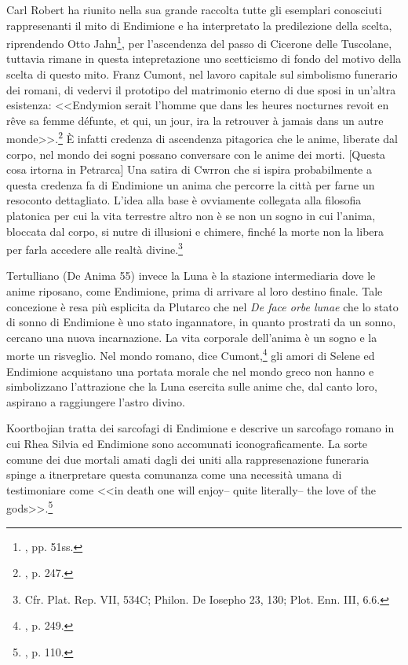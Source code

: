 \documentclass[12pt,a4paper,openright, oneside]{book}
\begin{document}
Carl Robert ha riunito nella sua grande raccolta tutte gli esemplari conosciuti rappresenanti il mito di Endimione e ha interpretato la predilezione della scelta, riprendendo Otto Jahn\footnote{\cite{Jahn}, pp. 51ss.}, per l'ascendenza del passo di Cicerone delle Tuscolane, tuttavia rimane in questa intepretazione uno scetticismo di fondo del motivo della scelta di questo mito.
Franz Cumont, nel lavoro capitale sul simbolismo funerario dei romani, di vedervi il prototipo del matrimonio eterno di due sposi in un'altra esistenza: <<Endymion serait l'homme que dans les heures nocturnes revoit en r\^eve sa femme défunte, et qui, un jour, ira la retrouver à jamais dans un autre monde>>.\footnote{\cite{Cumont}, p. 247.} È infatti credenza di ascendenza pitagorica che le anime, liberate dal corpo, nel mondo dei sogni possano conversare con le anime dei morti. [Questa cosa irtorna in Petrarca] Una satira di Cwrron che si ispira probabilmente a questa credenza fa di Endimione un anima che percorre la città per farne un resoconto dettagliato. L'idea alla base è ovviamente collegata alla filosofia platonica per cui la vita terrestre altro non è se non un sogno in cui l'anima, bloccata dal corpo, si nutre di illusioni e chimere, finché la morte non la libera per farla accedere alle realtà divine.\footnote{Cfr. Plat. Rep. VII, 534C; Philon. De Iosepho 23, 130; Plot. Enn. III, 6.6.}

Tertulliano (De Anima 55) invece la Luna è la stazione intermediaria dove le anime riposano, come Endimione, prima di arrivare al loro destino finale. Tale concezione è resa più esplicita da Plutarco che nel \textit{De face orbe lunae} che lo stato di sonno di Endimione è uno stato ingannatore, in quanto prostrati da un sonno, cercano una nuova incarnazione.
La vita corporale dell'anima è un sogno e la morte un risveglio.
Nel mondo romano, dice Cumont,\footnote{\cite{Cumont}, p. 249.} gli amori di Selene ed Endimione acquistano una portata morale che nel mondo greco non hanno e simbolizzano l'attrazione che la Luna esercita sulle anime che, dal canto loro, aspirano a raggiungere l'astro divino.
 

Koortbojian tratta dei sarcofagi di Endimione e descrive un sarcofago romano in cui Rhea Silvia ed Endimione sono accomunati iconograficamente. La sorte comune dei due mortali amati dagli dei uniti alla rappresenazione funeraria spinge a itnerpretare questa comunanza come una necessità umana di testimoniare come <<in death one will enjoy-- quite literally-- the love of the gods>>.\footnote{\cite{Koortbojian}, p. 110.}
\end{document}
